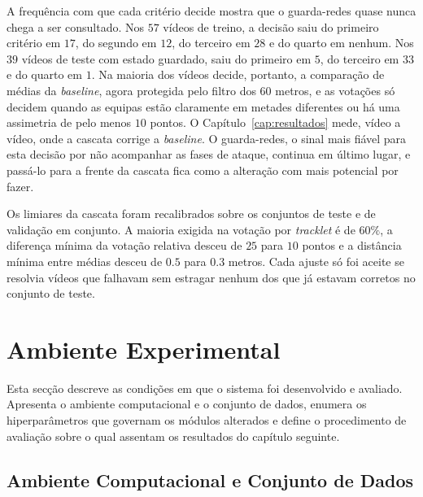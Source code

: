 A frequência com que cada critério decide mostra que o guarda-redes quase nunca chega a ser consultado. Nos $57$ vídeos de treino, a decisão saiu do primeiro critério em $17$, do segundo em $12$, do terceiro em $28$ e do quarto em nenhum. Nos $39$ vídeos de teste com estado guardado, saiu do primeiro em $5$, do terceiro em $33$ e do quarto em $1$. Na maioria dos vídeos decide, portanto, a comparação de médias da \emph{baseline}, agora protegida pelo filtro dos $60$ metros, e as votações só decidem quando as equipas estão claramente em metades diferentes ou há uma assimetria de pelo menos $10$ pontos. O Capítulo~\ref{cap:resultados} mede, vídeo a vídeo, onde a cascata corrige a \emph{baseline}. O guarda-redes, o sinal mais fiável para esta decisão por não acompanhar as fases de ataque, continua em último lugar, e passá-lo para a frente da cascata fica como a alteração com mais potencial por fazer.

Os limiares da cascata foram recalibrados sobre os conjuntos de teste e de validação em conjunto. A maioria exigida na votação por \emph{tracklet} é de $60\%$, a diferença mínima da votação relativa desceu de $25$ para $10$ pontos e a distância mínima entre médias desceu de $0.5$ para $0.3$ metros. Cada ajuste só foi aceite se resolvia vídeos que falhavam sem estragar nenhum dos que já estavam corretos no conjunto de teste.

\FloatBarrier

\section{Ambiente Experimental}

Esta secção descreve as condições em que o sistema foi desenvolvido e avaliado. Apresenta o ambiente computacional e o conjunto de dados, enumera os hiperparâmetros que governam os módulos alterados e define o procedimento de avaliação sobre o qual assentam os resultados do capítulo seguinte.

\subsection{Ambiente Computacional e Conjunto de Dados}\label{sec:ambiente}

